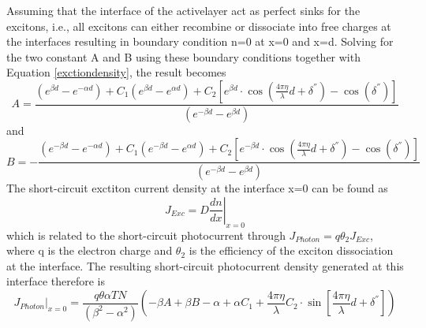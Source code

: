 \documentclass{article}
\begin{document}
Assuming that the interface of the activelayer act as perfect sinks for the
excitons, i.e., all excitons can either recombine or dissociate into free
charges at the interfaces resulting in boundary condition n=0 at x=0 and x=d.
Solving for the two constant A and B using these boundary conditions together
with Equation \ref{exctiondensity}, the result becomes
\begin{equation}
A=\frac{({{e}^{\beta d}}-{{e}^{-\alpha d}})+{{C}_{1}}({{e}^{\beta
d}}-{{e}^{\alpha d}})+{{C}_{2}}\left[ {{e}^{\beta d}}\cdot \cos \left( \frac{4\pi \eta }{\lambda }d+{{\delta }^{''}} \right)-\cos ({{\delta }^{''}}) \right]}{({{e}^{-\beta d}}-{{e}^{\beta d}})}
\end{equation}
and
\begin{equation}
B=-\frac{({{e}^{-\beta d}}-{{e}^{-\alpha d}})+{{C}_{1}}({{e}^{-\beta
d}}-{{e}^{\alpha d}})+{{C}_{2}}\left[ {{e}^{-\beta d}}\cdot \cos \left( \frac{4\pi \eta }{\lambda }d+{{\delta }^{''}} \right)-\cos ({{\delta }^{''}}) \right]}{({{e}^{-\beta d}}-{{e}^{\beta d}})}
\end{equation}
The short-circuit exctiton current density at the interface x=0 can be found as
\begin{equation}
{{J}_{Exc}}={{\left. D\frac{dn}{dx} \right|}_{x=0}}
\end{equation}
which is related to the short-circuit photocurrent through
${{J}_{Photon}}=q{{\theta }_{2}}{{J}_{Exc}}$, where q is the electron charge and
$\theta_2$ is the efficiency of the exciton dissociation at the interface. The
resulting short-circuit photocurrent density generated at this interface
therefore is 
\begin{equation}
{{\left. {{J}_{Photon}} \right|}_{x=0}}=\frac{q\theta \alpha TN}{({{\beta
}^{2}}-{{\alpha }^{2}})}\left( -\beta A+\beta B-\alpha +\alpha {{C}_{1}}+\frac{4\pi \eta }{\lambda }{{C}_{2}}\cdot \sin \left[ \frac{4\pi \eta }{\lambda }d+{{\delta }^{''}} \right] \right)
\end{equation}
{}

\end{document}
